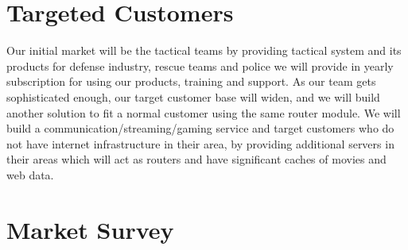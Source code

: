 \section{Targeted Customers}
Our initial market will be the tactical teams by providing tactical system and its products for defense industry, rescue teams and police we will provide in yearly subscription for using our products, training and support. As our team gets sophisticated enough, our target customer base will widen, and we will build another solution to fit a normal customer using the same router module. We will build a communication/streaming/gaming service and target customers who do not have internet infrastructure in their area, by providing additional servers in their areas which will act as routers and have significant caches of movies and web data.

\section{Market Survey}

